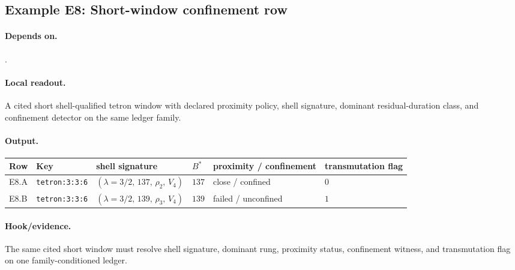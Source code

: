 \subsection{Example E8: Short-window confinement row}\label{ex:e8}
\paragraph{Depends on.} .
\paragraph{Local readout.} A cited short shell-qualified tetron window with declared proximity policy, shell signature, dominant residual-duration class, and confinement detector on the same ledger family.
\paragraph{Output.}
{\footnotesize
\begin{center}
\begin{tabular}{@{}llllll@{}}
\toprule
Row & Key & shell signature & $B^*$ & proximity / confinement & transmutation flag \\
\midrule
E8.A & \texttt{tetron:3:3:6} & $(\lambda\!=\!3/2,\,137,\,\rho_2,\,V_4)$ & $137$ & close / confined & $0$ \\
E8.B & \texttt{tetron:3:3:6} & $(\lambda\!=\!3/2,\,139,\,\rho_3,\,V_4)$ & $139$ & failed / unconfined & $1$ \\
\bottomrule
\end{tabular}
\end{center}}
\paragraph{Hook/evidence.} The same cited short window must resolve shell signature, dominant rung, proximity status, confinement witness, and transmutation flag on one family-conditioned ledger.

